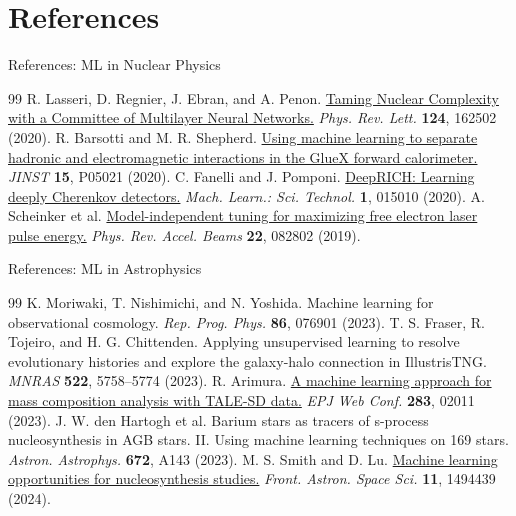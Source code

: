 \section*{References}
\setsource{}
\begin{frame}[c,label=references-nuclear]{References: ML in Nuclear Physics}
\footnotesize
\begin{thebibliography}{99}
\setlength{\itemsep}{1.1em}
R. Lasseri, D. Regnier, J. Ebran, and A. Penon.
\href{https://doi.org/10.1103/PhysRevLett.124.162502}{Taming Nuclear Complexity
with a Committee of Multilayer Neural Networks.}
\textit{Phys. Rev. Lett.} \textbf{124}, 162502 (2020).
R. Barsotti and M. R. Shepherd.
\href{https://doi.org/10.1088/1748-0221/15/05/P05021}{Using machine learning to
separate hadronic and electromagnetic interactions in the GlueX forward calorimeter.}
\textit{JINST} \textbf{15}, P05021 (2020).
C. Fanelli and J. Pomponi.
\href{https://doi.org/10.1088/2632-2153/ab845a}{DeepRICH: Learning deeply
Cherenkov detectors.}
\textit{Mach. Learn.: Sci. Technol.} \textbf{1}, 015010 (2020).
A. Scheinker et al.
\href{https://doi.org/10.1103/PhysRevAccelBeams.22.082802}{Model-independent
tuning for maximizing free electron laser pulse energy.}
\textit{Phys. Rev. Accel. Beams} \textbf{22}, 082802 (2019).
\end{thebibliography}
\end{frame}

\setsource{}
\begin{frame}[c,label=references-astro]{References: ML in Astrophysics}
\footnotesize
\begin{thebibliography}{99}
\setlength{\itemsep}{0.85em}
K. Moriwaki, T. Nishimichi, and N. Yoshida.
Machine learning for observational cosmology.
\textit{Rep. Prog. Phys.} \textbf{86}, 076901 (2023).
T. S. Fraser, R. Tojeiro, and H. G. Chittenden.
Applying unsupervised learning to resolve evolutionary histories and explore
the galaxy-halo connection in IllustrisTNG.
\textit{MNRAS} \textbf{522}, 5758--5774 (2023).
R. Arimura.
\href{https://doi.org/10.1051/epjconf/202328302011}{A machine learning approach
for mass composition analysis with TALE-SD data.}
\textit{EPJ Web Conf.} \textbf{283}, 02011 (2023).
J. W. den Hartogh et al.
Barium stars as tracers of s-process nucleosynthesis in AGB stars.
II. Using machine learning techniques on 169 stars.
\textit{Astron. Astrophys.} \textbf{672}, A143 (2023).
M. S. Smith and D. Lu.
\href{https://doi.org/10.3389/fspas.2024.1494439}{Machine learning opportunities
for nucleosynthesis studies.}
\textit{Front. Astron. Space Sci.} \textbf{11}, 1494439 (2024).
\end{thebibliography}
\end{frame}

